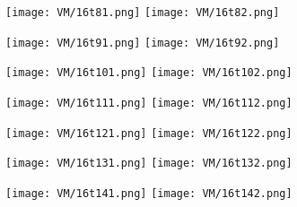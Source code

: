 

\begin{figure}[h]
		\centering
		\texttt{[image: VM/16t81.png]}
		\texttt{[image: VM/16t82.png]}
\label{ris:image}
\end{figure}



\begin{figure}[h]
		\centering
		\texttt{[image: VM/16t91.png]}
		\texttt{[image: VM/16t92.png]}
\label{ris:image}
\end{figure}



\begin{figure}[h]
		\centering
		\texttt{[image: VM/16t101.png]}
		\texttt{[image: VM/16t102.png]}
\label{ris:image}
\end{figure}



\begin{figure}[h]
		\centering
		\texttt{[image: VM/16t111.png]}
		\texttt{[image: VM/16t112.png]}
\label{ris:image}
\end{figure}



\begin{figure}[h]
		\centering
		\texttt{[image: VM/16t121.png]}
		\texttt{[image: VM/16t122.png]}
\label{ris:image}
\end{figure}



\begin{figure}[h]
		\centering
		\texttt{[image: VM/16t131.png]}
		\texttt{[image: VM/16t132.png]}
\label{ris:image}
\end{figure}



\begin{figure}[h]
		\centering
		\texttt{[image: VM/16t141.png]}
		\texttt{[image: VM/16t142.png]}
\label{ris:image}
\end{figure}

